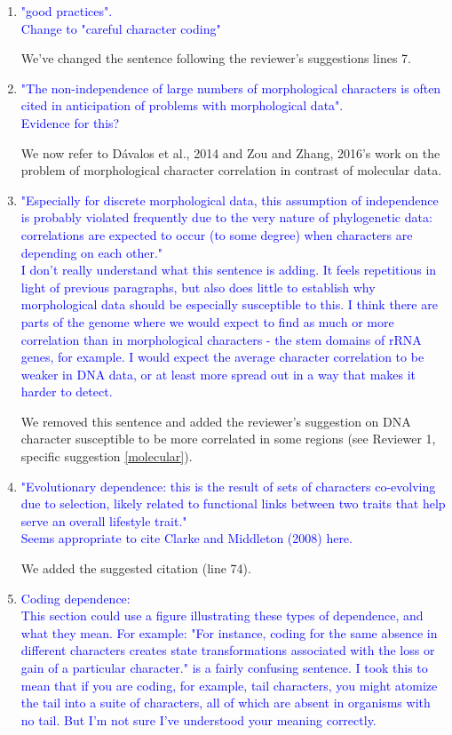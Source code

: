 \documentclass[12pt,letterpaper]{article}
\begin{document}
\begin{enumerate}
\item{\textcolor{blue}{"good practices".\\
Change to "careful character coding"}}

We've changed the sentence following the reviewer's suggestions lines 7.

\item{\textcolor{blue}{"The non-independence of large numbers of morphological characters is often cited in anticipation of problems with morphological data".\\
Evidence for this?}}

We now refer to D\'{a}valos et al., 2014 and Zou and Zhang, 2016's work on the problem of morphological character correlation in contrast of molecular data.

\item{\textcolor{blue}{"Especially for discrete morphological data, this assumption of independence is probably violated frequently due to the very nature of phylogenetic data: correlations are expected to occur (to some degree) when characters are depending on each other."\\
I don't really understand what this sentence is adding. It feels repetitious in light of previous paragraphs, but also does little to establish why morphological data should be especially susceptible to this. I think there are parts of the genome where we would expect to find as much or more correlation than in morphological characters - the stem domains of rRNA genes, for example. I would expect the average character correlation to be weaker in DNA data, or at least more spread out in a way that makes it harder to detect.}}

We removed this sentence and added the reviewer's suggestion on DNA character susceptible to be more correlated in some regions (see Reviewer 1, specific suggestion \ref{molecular}).

\item{\textcolor{blue}{"Evolutionary dependence: this is the result of sets of characters co-evolving due to selection, likely related to functional links between two traits that help serve an overall lifestyle trait."\\
Seems appropriate to cite Clarke and Middleton (2008) here.}}

We added the suggested citation (line 74).

\item{\textcolor{blue}{Coding dependence:\\
This section could use a figure illustrating these types of dependence, and what they mean. For example: "For instance, coding for the same absence in different characters creates state transformations associated with the loss or gain of a particular character." is a fairly confusing sentence. I took this to mean that if you are coding, for example, tail characters, you might atomize the tail into a suite of characters, all of which are absent in organisms with no tail. But I'm not sure I've understood your meaning correctly.}}


\end{enumerate}
\end{document}
